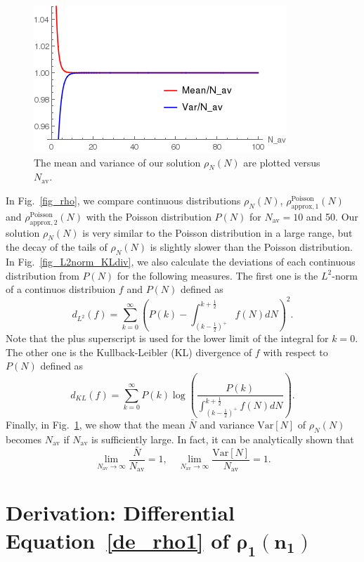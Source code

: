 \documentclass{article}
\newcommand{\Nav}{{N_\mathrm{av}}}
\begin{document}
\begin{figure}[t!]
\begin{center}
\includegraphics[width=0.4\linewidth]{fig4/meanvar.png}
\caption{\label{fig_meanvar}The mean and variance of our solution $\rho_N(N)$ are plotted versus $\Nav$.}
\end{center}
\end{figure}
In Fig.~\ref{fig_rho}, we compare continuous distributions $\rho_N(N)$, $\rho^\mathrm{Poisson}_\mathrm{approx,1}(N)$ and $\rho^\mathrm{Poisson}_\mathrm{approx,2}(N)$ with the Poisson distribution $P(N)$ for $\Nav=10$ and 50.
Our solution $\rho_N(N)$ is very similar to the Poisson distribution in a large range, but the decay of the tails of $\rho_N(N)$ is slightly slower than the Poisson distribution. 
In Fig.~\ref{fig_L2norm_KLdiv}, we also calculate the deviations of each continuous distribution from $P(N)$ for the following measures.
The first one is the $L^2$-norm of a continuos distribuion $f$ and $P(N)$ defined as  
\begin{equation}
\label{L2norm}
d_{L^2}(f)=\sum_{k=0}^\infty \left(P(k)-\int_{(k-\frac12)^+}^{k+\frac12}f(N)dN\right)^2.
\end{equation}
Note that the plus superscript is used for the lower limit of the integral for $k=0$.
The other one is the Kullback-Leibler (KL) divergence of $f$ with respect to $P(N)$ defined as
\begin{equation}
\label{KLdiv}
d_{KL}(f)=\sum_{k=0}^\infty P(k)\log\left(\frac{P(k)}{\int_{(k-\frac12)^+}^{k+\frac12}f(N)dN}\right).
\end{equation}
Finally, in Fig.~\ref{fig_meanvar}, we show that the mean $\bar{N}$ and variance $\mathrm{Var}[N]$ of $\rho_N(N)$ becomes $\Nav$ if $\Nav$ is sufficiently large.
In fact, it can be analytically shown that 
\begin{equation}
\lim_{\Nav\rightarrow\infty}\frac{\bar{N}}{\Nav}=1,\quad \lim_{\Nav\rightarrow\infty}\frac{\mathrm{Var}[N]}{\Nav}=1.
\end{equation}

\section{\label{sec_deriv_de_rho1}Derivation: Differential Equation~\eqref{de_rho1} of $\bm{\rho_1(n_1)}$}
\end{document}
